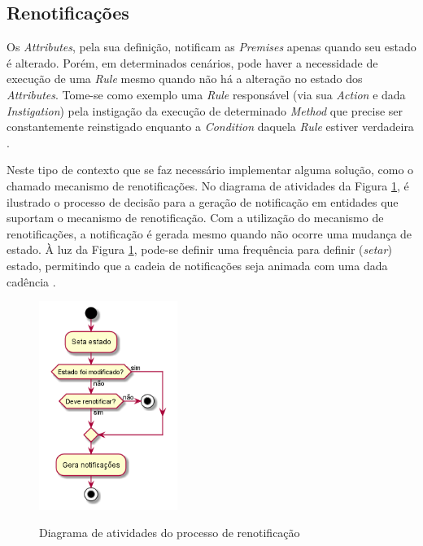 \subsection{Renotificações}

Os \textit{Attributes}, pela sua definição, notificam as \textit{Premises}
apenas quando seu estado é alterado. Porém, em determinados cenários, pode haver
a necessidade de execução de uma \textit{Rule} mesmo quando não há a alteração
no estado dos \textit{Attributes}. Tome-se como exemplo uma \textit{Rule}
responsável (via sua \textit{Action} e dada \textit{Instigation}) pela
instigação da execução de determinado \textit{Method} que precise ser
constantemente reinstigado enquanto a \textit{Condition} daquela \textit{Rule}
estiver verdadeira \cite{msc_Banaszewski_2009}.

Neste tipo de contexto que se faz necessário implementar alguma solução, como o
chamado mecanismo de renotificações. No diagrama de atividades da Figura
\ref{fig:renotif_activity}, é ilustrado o processo de decisão para a geração de
notificação em entidades que suportam o mecanismo de renotificação. Com a
utilização do mecanismo de renotificações, a notificação é gerada mesmo quando
não ocorre uma mudança de estado. À luz da Figura \ref{fig:renotif_activity},
pode-se definir uma frequência para definir (\textit{setar}) estado, permitindo
que a cadeia de notificações seja animada com uma dada cadência
\cite{msc_Banaszewski_2009}.

\begin{figure}[!htb]
  \centering
  \caption{Diagrama de atividades do processo de renotificação}
  \includegraphics[width=0.4\textwidth]{../out/diagrams/renotification/renotif.png}
  \smallskip
  \label{fig:renotif_activity}
\end{figure}

